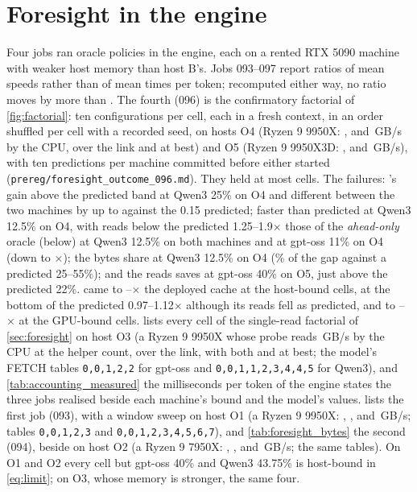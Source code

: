 \section{Foresight in the engine}\label{app:foresight}
Four jobs ran oracle policies in the engine, each on a rented RTX 5090 machine with weaker host memory than host B's. Jobs 093--097 report ratios of mean speeds rather than of mean times per token; recomputed either way, no ratio
moves by more than \fxMeanKindDiffMax.
The fourth (096) is the confirmatory factorial of \cref{fig:factorial}: ten configurations per cell, each in a fresh
context, in an order shuffled per cell with a recorded seed, on hosts O4 (Ryzen 9 9950X: \fxCpuFour, \fxLinkFour{} and
\fxBestFour\,GB/s by the CPU, over the link and at best) and O5 (Ryzen 9 9950X3D: \fxCpuFive, \fxLinkFive{} and
\fxBestFive\,GB/s), with ten predictions per machine committed before either started
(\texttt{prereg/foresight\_outcome\_096.md}). They held at most cells. The failures: \MinOne's gain above the predicted band at Qwen3 25\% on O4 and different
between the two machines by up to \fxFetchSpreadMax{} against the 0.15 predicted;  faster than
predicted at Qwen3 12.5\% on O4, with reads below the predicted 1.25--1.9$\times$ those of the \emph{ahead-only} oracle (below) at Qwen3 12.5\% on
both machines and at gpt-oss 11\% on O4 (down to \fxNbReadsOverLeadMin$\times$); the bytes share at Qwen3 12.5\% on O4
(\amBytesHostMax\% of the gap against a predicted 25--55\%); and the reads \DepOne{} saves at gpt-oss 40\% on O5,
just above the predicted 22\%. \DepOne{} came to \fxFoaHostMin--\fxFoaHostMax$\times$ the deployed cache at the host-bound cells, at the bottom of the predicted 0.97--1.12$\times$ although its reads fell as predicted, and to \fxFoaGpuFiveMin--\fxFoaGpuFourMax$\times$ at the GPU-bound cells.
 lists every cell of the single-read factorial of \cref{sec:foresight} on host O3 (a Ryzen 9 9950X
whose probe reads \fsfHostCpu\,GB/s by the CPU at the helper count, \fsfHostLink{} over the link, \fsfHostBoth{} with
both and \fsfHostMax{} at best; the model's FETCH tables \texttt{0,0,1,2,2} for gpt-oss and \texttt{0,0,1,1,2,3,4,4,5}
for Qwen3), and \cref{tab:accounting_measured} the milliseconds per token of the engine states the three jobs
realised beside each machine's bound and the model's values.  lists the first job (093),
 with a window sweep on host O1 (a Ryzen 9 9950X: \fsmHostCpu, \fsmHostLink, \fsmHostBoth{} and
\fsmHostMax\,GB/s; tables \texttt{0,0,1,2,3} and \texttt{0,0,1,2,3,4,5,6,7}), and \cref{tab:foresight_bytes} the
second (094), \MinTwo{} beside  on host O2 (a Ryzen 9 7950X:
\fsbHostCpu, \fsbHostLink, \fsbHostBoth{} and \fsbHostMax\,GB/s; the same tables). On O1 and O2 every cell but
gpt-oss 40\% and Qwen3 43.75\% is host-bound in \cref{eq:limit}; on O3, whose memory is stronger, the same four.


